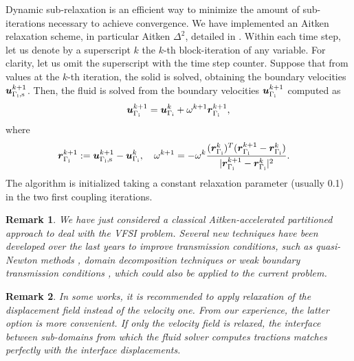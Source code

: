 \documentclass[11pt,english]{article}
\newtheorem{remark}{Remark}[section]
\begin{document}
Dynamic sub-relaxation is an efficient way to minimize the amount of sub-iterations necessary to achieve convergence. We have implemented an Aitken relaxation scheme, in particular Aitken $\Delta^2$, detailed in \cite{kuttler2008fixed}. Within each time step, let us denote by a superscript $k$ the $k$-th block-iteration of any variable. For clarity, let us omit the superscript with the time step counter. Suppose that from values at the $k$-th iteration, the solid is solved, obtaining the boundary velocities $\boldsymbol{u}_{{\Gamma_{\rm i},{\textrm{s}}}}^{k+1}$. Then, the fluid is solved from the boundary velocities $\boldsymbol{u}_{\Gamma_{\rm i}}^{k+1}$ computed as
\begin{align*}
\boldsymbol{u}_{\Gamma_{\rm i}}^{k+1} = \boldsymbol{u}_{\Gamma_{\rm i}}^{k} + \omega^{k+1} \boldsymbol{r}_{\Gamma_{\textrm{i}}}^{k+1},
\end{align*}
where
\begin{align*}
\boldsymbol{r}_{\Gamma_{\textrm{i}}}^{k+1} & := \boldsymbol{u}_{{\Gamma_{\rm i},{\textrm{s}}}}^{k+1}- \boldsymbol{u}_{\Gamma_{\rm i}}^{k},\quad
\omega^{k+1}  = -\omega^k \frac{(\boldsymbol{r}_{\Gamma_{\textrm{i}}}^{k})^{T}(\boldsymbol{r}_{\Gamma_{\textrm{i}}}^{k+1}-\boldsymbol{r}_{\Gamma_{\textrm{i}}}^{k})}{|\boldsymbol{r}_{\Gamma_{\textrm{i}}}^{k+1}-\boldsymbol{r}_{\Gamma_{\textrm{i}}}^{k}|^{2}}. 
\end{align*}
The algorithm is initialized taking a constant relaxation parameter (usually 0.1) in the two first coupling iterations. 

\begin{remark}
We have just considered a classical Aitken-accelerated partitioned approach to deal with the VFSI problem. Several new techniques have been developed over the last years to improve transmission conditions, such as quasi-Newton methods \cite{FSIQN2014,FSIQN2016}, domain decomposition techniques \cite{FSIDDM2015} or weak boundary transmission conditions \cite{FSIWeak2020}, which could also be applied to the current problem.
\end{remark}

\begin{remark}
In some works, it is recommended to apply relaxation of the displacement field instead of the velocity one. From our experience, the latter option is more convenient. If only the velocity field is relaxed, the interface between sub-domains from which the fluid solver computes tractions matches perfectly with the interface displacements. 
\end{remark}
\end{document}
